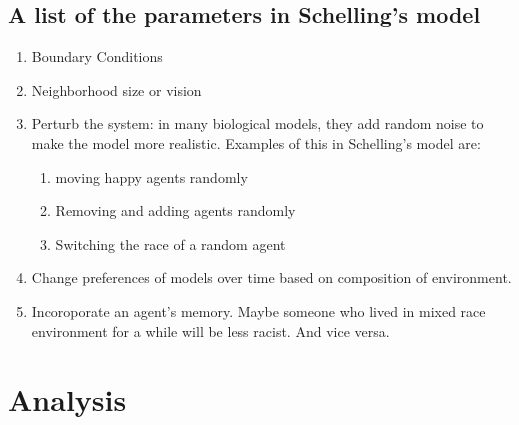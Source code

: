 \documentclass[11pt,twoside]{amsart}
\theoremstyle{theorem}
\theoremstyle{definition}
\theoremstyle{remark}
\begin{document}
\subsection{A list of the parameters in Schelling's model}
    \begin{enumerate}
        \item Boundary Conditions
        \item Neighborhood size or vision
        \item Perturb the system: in many biological models, they add random noise to make the model more realistic. 
            Examples of this in Schelling's model are:
            \begin{enumerate}
                \item moving happy agents randomly
                \item Removing and adding agents randomly
                \item Switching the race of a random agent
            \end{enumerate}
        \item Change preferences of models over time based on composition of environment. 
        \item Incoroporate an agent's memory. Maybe someone who lived in mixed race environment for a while will be less racist. And vice versa.
    \end{enumerate}
\section{Analysis}

\printbibliography
\end{document}
